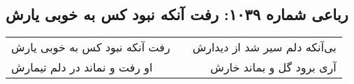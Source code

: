 \begin{center}
\section*{رباعی شماره ۱۰۳۹: رفت آنکه نبود کس به خوبی یارش}
\label{sec:1039}
\begin{longtable}{l p{0.5cm} r}
رفت آنکه نبود کس به خوبی یارش
&&
بی‌آنکه دلم سیر شد از دیدارش
\\
او رفت و نماند در دلم تیمارش
&&
آری برود گل و بماند خارش
\\
\end{longtable}
\end{center}
